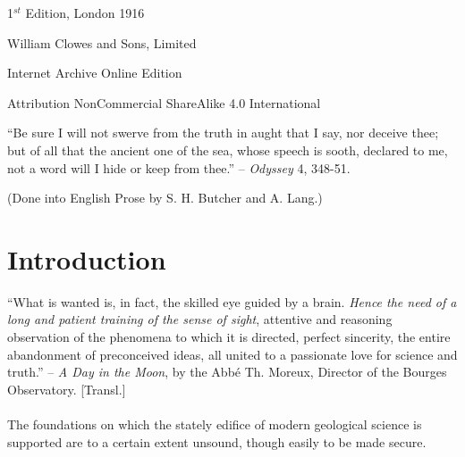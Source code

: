 \documentclass[a4paper, 12pt, oneside]{article}
\begin{document}
\begin{titlepage}
	
		
	\vspace*{\fill}%
	
	1$^{st}$ Edition, London 1916 %
	
	{\small William Clowes and Sons, Limited } %

	\vspace{1\baselineskip} %

    Internet Archive Online Edition  %
	
	{\small Attribution NonCommercial ShareAlike 4.0 International } %
\end{titlepage}
\setlength{\parskip}{1mm plus1mm minus1mm}
\setcounter{tocdepth}{2}
\setcounter{secnumdepth}{3}
\tableofcontents
\clearpage
\listoffigures{}
\clearpage
\begin{displayquote}
``Be sure I will not swerve from the truth in aught that I say, nor deceive thee; but of all that the ancient one of the sea, whose speech is sooth, declared to me, not a word will I hide or keep from thee.'' -- \emph{Odyssey} 4, 348-51.

(Done into English Prose by S. H. Butcher and A. Lang.)
\end{displayquote}
\clearpage
\section*{Introduction}
\begin{displayquote}
``What is wanted is, in fact, the skilled eye guided by a brain. \emph{Hence the need of a long and patient training of the sense of sight}, attentive and reasoning observation of the phenomena to which it is directed, perfect sincerity, the entire abandonment of preconceived ideas, all united to a passionate love for science and truth.'' -- \emph{A Day in the Moon}, by the Abbé Th. Moreux, Director of the Bourges Observatory. [Transl.]
\end{displayquote}
\paragraph{}
The foundations on which the stately edifice of modern geological science is supported are to a certain extent unsound, though easily to be made secure.
\end{document}

